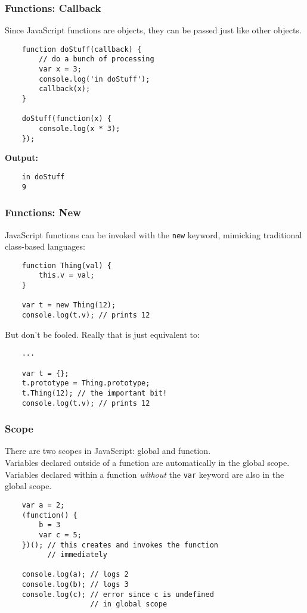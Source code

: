 \documentclass{lug}
\begin{document}
\begin{frame}[fragile]
    \frametitle{Functions: Callback}
    Since JavaScript functions are objects, they can be passed just like other objects.

    \begin{verbatim}
    function doStuff(callback) {
        // do a bunch of processing
        var x = 3;
        console.log('in doStuff');
        callback(x);
    }

    doStuff(function(x) {
        console.log(x * 3);
    });
    \end{verbatim}

    \textbf{Output:}
    \begin{verbatim}
    in doStuff
    9
    \end{verbatim}
\end{frame}

\begin{frame}[fragile]
    \frametitle{Functions: New}
    JavaScript functions can be invoked with the \texttt{new} keyword, mimicking traditional
    class-based languages:

    \begin{verbatim}
    function Thing(val) {
        this.v = val;
    }

    var t = new Thing(12);
    console.log(t.v); // prints 12
    \end{verbatim}

    But don't be fooled. Really that is just equivalent to:

    \begin{verbatim}
    ...

    var t = {};
    t.prototype = Thing.prototype;
    t.Thing(12); // the important bit!
    console.log(t.v); // prints 12
    \end{verbatim}
\end{frame}

\begin{frame}[fragile]
    \frametitle{Scope}

    There are two scopes in JavaScript: global and function.\footnotemark[1]\\

    Variables declared outside of a function are automatically in the global scope.\\

    Variables declared within a function \textit{without} the \texttt{var} keyword are also in the
    global scope.

    \begin{verbatim}
    var a = 2;
    (function() {
        b = 3
        var c = 5;
    })(); // this creates and invokes the function
          // immediately

    console.log(a); // logs 2
    console.log(b); // logs 3
    console.log(c); // error since c is undefined
                    // in global scope
    \end{verbatim}
\end{frame}
\end{document}
